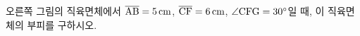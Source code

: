 \noindent\begin{minipage}[t]{0.58\linewidth}\vspace{0pt}\raggedright 오른쪽 그림의 직육면체에서 $\overline{\mathrm{AB}}=5\,\mathrm{cm}$, $\overline{\mathrm{CF}}=6\,\mathrm{cm}$, $\angle\mathrm{CFG}=30^\circ$일 때, 이 직육면체의 부피를 구하시오.\end{minipage}\hfill\begin{minipage}[t]{0.4\linewidth}\vspace{0pt}\centering \resizebox{\ifdim\width>\linewidth\linewidth\else\width\fi}{!}{}\end{minipage}\par
